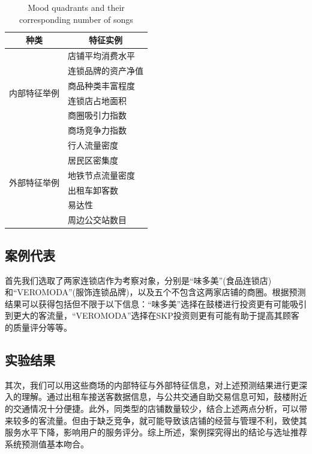 \documentclass[UTF8]{llncs}
\begin{document}
\begin{table}
	\centering
	\caption{Mood quadrants and their corresponding number of songs}
	\label{feature}
	\begin{tabular}{c|p{8cm}<{\centering}}
		\hline
		\textbf{种类}  & \multicolumn{1}{c}{\textbf{特征实例}}         \\ \hline
		\multirow{6}{*}{内部特征举例} & 店铺平均消费水平 \\ \cline{2-2} 
		                              & 连锁品牌的资产净值 \\ \cline{2-2}
		                              & 商品种类丰富程度   \\ \cline{2-2}
		                              & 连锁店占地面积   \\ \cline{2-2}
		                              & 商圈吸引力指数  \\ \cline{2-2}
									 & 商场竞争力指数   \\ \hline \hline
		\multirow{6}{*}{外部特征举例} & 行人流量密度   \\ \cline{2-2}
									 & 居民区密集度   \\ \cline{2-2}
									 & 地铁节点流量密度   \\ \cline{2-2}
									 & 出租车卸客数   \\ \cline{2-2}
		                             & 易达性       \\ \cline{2-2}
		                             & 周边公交站数目 \\ \hline
	\end{tabular}
\end{table}














\subsection{案例代表}
首先我们选取了两家连锁店作为考察对象，分别是“味多美”(食品连锁店)和“VEROMODA”(服饰连锁品牌)，以及五个不包含这两家店铺的商圈。根据预测结果可以获得包括但不限于以下信息：“味多美”选择在鼓楼进行投资更有可能吸引到更大的客流量，“VEROMODA”选择在SKP投资则更有可能有助于提高其顾客的质量评分等等。
\subsection{实验结果}
其次，我们可以用这些商场的内部特征与外部特征信息，对上述预测结果进行更深入的理解。通过出租车接送客数据信息，与公共交通自助交易信息可知，鼓楼附近的交通情况十分便捷。此外，同类型的店铺数量较少，结合上述两点分析，可以带来较多的客流量。但由于缺乏竞争，就可能导致该店铺的经营与管理不利，致使其服务水平下降，影响用户的服务评分。综上所述，案例探究得出的结论与选址推荐系统预测值基本吻合。
\end{document}

